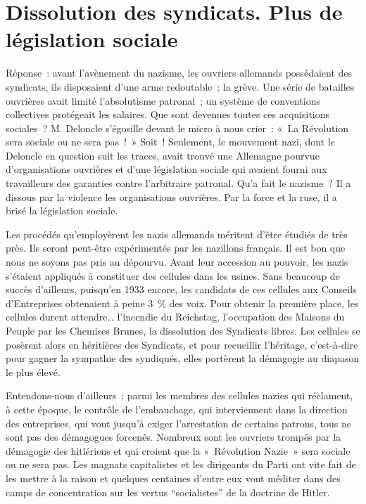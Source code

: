 \documentclass[french,twoside]{book} %
\begin{document}
\section[Dissolution des syndicats. Plus de législation sociale]{Dissolution des syndicats. Plus de législation sociale}
\noindent Réponse : avant l’avènement du nazisme, les ouvriers allemands possédaient des syndicats, ils disposaient d’une arme redoutable : la grève. Une série de batailles ouvrières avait limité l’absolutisme patronal ; un système de conventions collectives protégeait les salaires. Que sont devenues toutes ces acquisitions sociales ? M. Deloncle s’égosille devant le micro à nous crier : « La Révolution sera sociale ou ne sera pas ! » Soit ! Seulement, le mouvement nazi, dont le Deloncle en question suit les traces, avait trouvé une Allemagne pourvue d’organisations ouvrières et d’une législation sociale qui avaient fourni aux travailleurs des garanties contre l’arbitraire patronal. Qu’a fait le nazisme ? Il a dissous par la violence les organisations ouvrières. Par la force et la ruse, il a brisé la législation sociale.\par
Les procédés qu’employèrent les nazis allemands méritent d’être étudiés de très près. Ils seront peut-être expérimentés par les nazillons français. Il est bon que nous ne soyons pas pris au dépourvu. Avant leur accession au pouvoir, les nazis s’étaient appliqués à constituer des cellules dans les usines. Sans beaucoup de succès d’ailleurs, puisqu’en 1933 encore, les candidats de ces cellules aux Conseils d’Entreprises obtenaient à peine 3 \% des voix. Pour obtenir la première place, les cellules durent attendre… l’incendie du Reichstag, l’occupation des Maisons du Peuple par les Chemises Brunes, la dissolution des Syndicats libres. Les cellules se posèrent alors en héritières des Syndicats, et pour recueillir l’héritage, c’est-à-dire pour gagner la sympathie des syndiqués, elles portèrent la démagogie au diapason le plus élevé.\par
Entendons-nous d’ailleurs ; parmi les membres des cellules nazies qui réclament, à cette époque, le contrôle de l’embauchage, qui interviennent dans la direction des entreprises, qui vont jusqu’à exiger l’arrestation de certains patrons, tous ne sont pas des démagogues forcenés. Nombreux sont les ouvriers trompés par la démagogie des hitlériens et qui croient que la « Révolution Nazie » sera sociale ou ne sera pas. Les magnats capitalistes et les dirigeants du Parti ont vite fait de les mettre à la raison et quelques centaines d’entre eux vont méditer dans des camps de concentration sur les vertus “socialistes” de la doctrine de Hitler.
\end{document}
